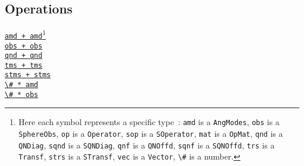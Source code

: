 \documentclass{timesjhep}
\begin{document}
\begin{multicols}{3}
    \subsection*{Operations}
    \noindent 
    \href{https://docs.fuzzified.world/models/\#Base.:+-Tuple{AngModes,\%20AngModes}}{\lstinline|amd + amd|}\footnote{Here each symbol represents a specific type~: \lstinline[basicstyle=\ttfamily\scriptsize]|amd| is a \lstinline[basicstyle=\ttfamily\scriptsize]|AngModes|,  \lstinline[basicstyle=\ttfamily\scriptsize]|obs| is a \lstinline[basicstyle=\ttfamily\scriptsize]|SphereObs|, \lstinline[basicstyle=\ttfamily\scriptsize]|op| is a \lstinline[basicstyle=\ttfamily\scriptsize]|Operator|, \lstinline[basicstyle=\ttfamily\scriptsize]|sop| is a \lstinline[basicstyle=\ttfamily\scriptsize]|SOperator|, \lstinline[basicstyle=\ttfamily\scriptsize]|mat| is a \lstinline[basicstyle=\ttfamily\scriptsize]|OpMat|, \lstinline[basicstyle=\ttfamily\scriptsize]|qnd| is a \lstinline[basicstyle=\ttfamily\scriptsize]|QNDiag|, \lstinline[basicstyle=\ttfamily\scriptsize]|sqnd| is a  \lstinline[basicstyle=\ttfamily\scriptsize]|SQNDiag|, \lstinline[basicstyle=\ttfamily\scriptsize]|qnf| is a \lstinline[basicstyle=\ttfamily\scriptsize]|QNOffd|, \lstinline[basicstyle=\ttfamily\scriptsize]|sqnf| is a  \lstinline[basicstyle=\ttfamily\scriptsize]|SQNOffd|, \lstinline[basicstyle=\ttfamily\scriptsize]|trs| is a \lstinline[basicstyle=\ttfamily\scriptsize]|Transf|, \lstinline[basicstyle=\ttfamily\scriptsize]|strs| is a \lstinline[basicstyle=\ttfamily\scriptsize]|STransf|, \lstinline[basicstyle=\ttfamily\scriptsize]|vec| is a \lstinline[basicstyle=\ttfamily\scriptsize]|Vector|, \lstinline[basicstyle=\ttfamily\scriptsize]|\#| is a number.}\\
    \href{https://docs.fuzzified.world/models/\#Base.:+-Tuple{SphereObs,\%20SphereObs}}{\lstinline|obs + obs|}\\
    \href{https://docs.fuzzified.world/core/\#Base.:+-Tuple{QNDiag,\%20QNDiag}}{\lstinline|qnd + qnd|}\\
    \href{https://docs.fuzzified.world/core/\#Base.:+-Tuple{Vector{Term},\%20Vector{Term}}}{\lstinline|tms + tms|}\\
    \href{https://docs.fuzzified.world/fuzzifino/\#Base.:+-Tuple{Vector{STerm},\%20Vector{STerm}}}{\lstinline|stms + stms|}\\
    \href{https://docs.fuzzified.world/models/\#Base.:*-Tuple{Number,\%20AngModes}}{\lstinline|\# * amd|}\\
    \href{https://docs.fuzzified.world/models/\#Base.:*-Tuple{Number,\%20SphereObs}}{\lstinline|\# * obs|}\\

\end{multicols}
\end{document}
